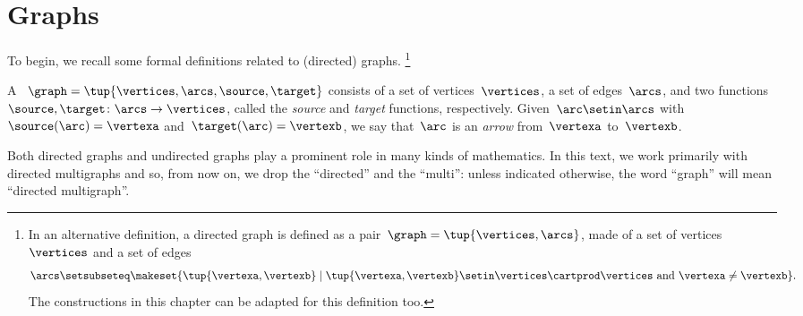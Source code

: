 
\section{Graphs}


To begin, we recall some formal definitions related to (directed) graphs.
\footnote{
    In an alternative definition, a directed graph is defined as a pair~$\graph=\tup{\vertices, \arcs}$, made of a set of vertices~$\vertices$ and a set of edges
    \begin{equation}
        \arcs \setsubseteq \makeset{ \tup{\vertexa, \vertexb} \mid \tup{\vertexa, \vertexb} \setin \vertices \cartprod \vertices \text{ and } \vertexa \neq \vertexb}.
    \end{equation}
    The constructions in this chapter can be adapted for this definition too.
}

\begin{definition}
    \label{def:Graph}
    A \emph{}~$\graph=\tup{\vertices,\arcs, \source,\target}$ consists of a set of vertices~$\vertices$, a set of edges~$\arcs$, and two functions~$\source,\target \colon \arcs \to \vertices$, called the \emph{source} and \emph{target} functions, respectively.
    Given~$\arc\setin \arcs$ with~$\source(\arc)=\vertexa$ and~$\target(\arc)=\vertexb$, we say that~$\arc$ is an \emph{arrow} from~$\vertexa$ to~$\vertexb$.
\end{definition}


\begin{remark}
    Both directed graphs and undirected graphs play a prominent role in many kinds of mathematics.
    In this text, we work primarily with directed multigraphs and so, from now on, we drop the ``directed'' and the ``multi'': unless indicated otherwise, the word ``graph'' will mean ``directed multigraph''.
\end{remark}

